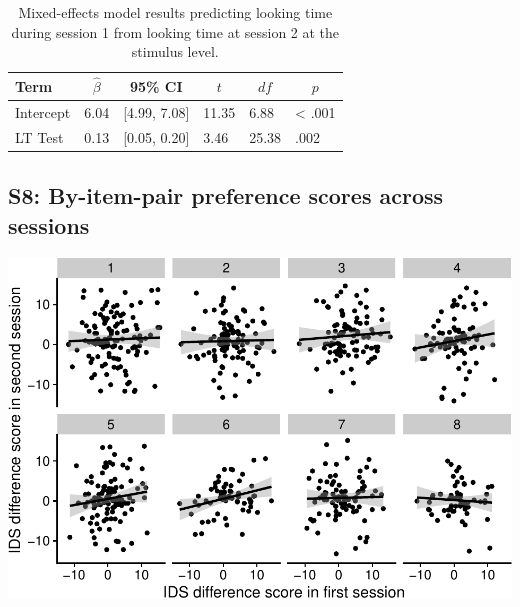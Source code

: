 \documentclass[
  man, donotrepeattitle,floatsintext]{apa6}
\begin{document}
\begin{table}[tbp]

\begin{center}
\begin{threeparttable}

\caption{\label{tab:unnamed-chunk-11}Mixed-effects model results predicting looking time during session 1 from looking time at session 2 at the stimulus level.}

\begin{tabular}{llllll}
\toprule
Term & \multicolumn{1}{c}{$\hat{\beta}$} & \multicolumn{1}{c}{95\% CI} & \multicolumn{1}{c}{$t$} & \multicolumn{1}{c}{$\mathit{df}$} & \multicolumn{1}{c}{$p$}\\
\midrule
Intercept & 6.04 & {}[4.99, 7.08] & 11.35 & 6.88 & < .001\\
LT Test & 0.13 & {}[0.05, 0.20] & 3.46 & 25.38 & .002\\
\bottomrule
\end{tabular}

\end{threeparttable}
\end{center}

\end{table}

\hypertarget{s8-by-item-pair-preference-scores-across-sessions}{%
\subsection{S8: By-item-pair preference scores across sessions}\label{s8-by-item-pair-preference-scores-across-sessions}}

\includegraphics{MB1T_supplement_files/figure-latex/unnamed-chunk-12-1.pdf}
\end{document}
